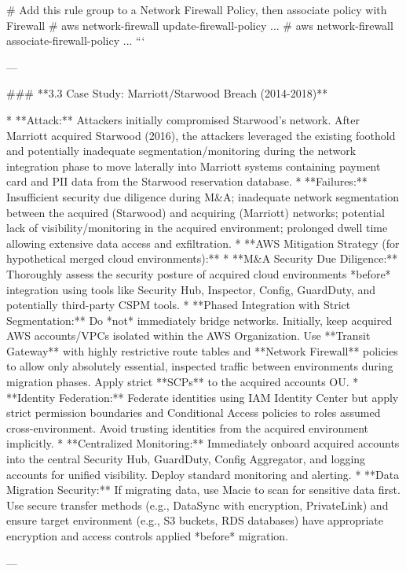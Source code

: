 \documentclass{article}
\begin{document}
# Add this rule group to a Network Firewall Policy, then associate policy with Firewall
# aws network-firewall update-firewall-policy ...
# aws network-firewall associate-firewall-policy ...
```

---

### **3.3 Case Study: Marriott/Starwood Breach (2014-2018)**

* **Attack:** Attackers initially compromised Starwood's network. After Marriott acquired Starwood (2016), the attackers leveraged the existing foothold and potentially inadequate segmentation/monitoring during the network integration phase to move laterally into Marriott systems containing payment card and PII data from the Starwood reservation database.
* **Failures:** Insufficient security due diligence during M&A; inadequate network segmentation between the acquired (Starwood) and acquiring (Marriott) networks; potential lack of visibility/monitoring in the acquired environment; prolonged dwell time allowing extensive data access and exfiltration.
* **AWS Mitigation Strategy (for hypothetical merged cloud environments):**
    * **M&A Security Due Diligence:** Thoroughly assess the security posture of acquired cloud environments *before* integration using tools like Security Hub, Inspector, Config, GuardDuty, and potentially third-party CSPM tools.
    * **Phased Integration with Strict Segmentation:** Do *not* immediately bridge networks. Initially, keep acquired AWS accounts/VPCs isolated within the AWS Organization. Use **Transit Gateway** with highly restrictive route tables and **Network Firewall** policies to allow only absolutely essential, inspected traffic between environments during migration phases. Apply strict **SCPs** to the acquired accounts OU.
    * **Identity Federation:** Federate identities using IAM Identity Center but apply strict permission boundaries and Conditional Access policies to roles assumed cross-environment. Avoid trusting identities from the acquired environment implicitly.
    * **Centralized Monitoring:** Immediately onboard acquired accounts into the central Security Hub, GuardDuty, Config Aggregator, and logging accounts for unified visibility. Deploy standard monitoring and alerting.
    * **Data Migration Security:** If migrating data, use Macie to scan for sensitive data first. Use secure transfer methods (e.g., DataSync with encryption, PrivateLink) and ensure target environment (e.g., S3 buckets, RDS databases) have appropriate encryption and access controls applied *before* migration.

---
\end{document}
